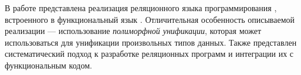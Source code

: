 

В работе представлена реализация реляционного языка программирования \miniKanren{}, встроенного в функциональный язык \OCaml{}.
Отличительная особенность описываемой реализации --- использование \emph{полиморфной унификации}, которая может использоваться для унификации произвольных типов данных.
Также представлен систематический подход к разработке реляционных программ и интеграции их с функциональным кодом.


